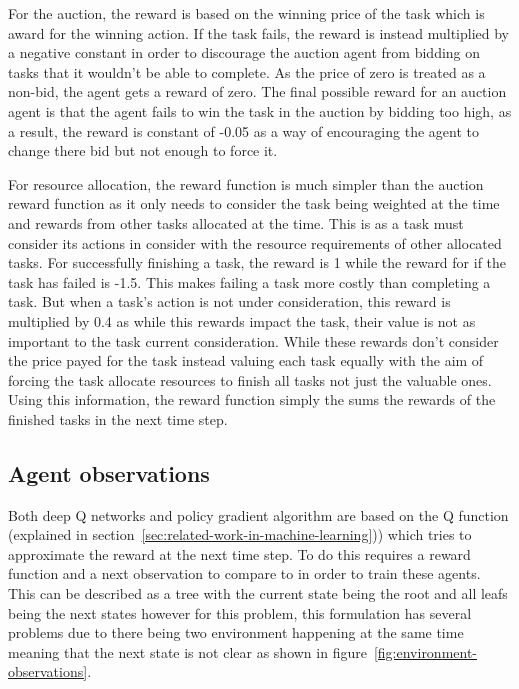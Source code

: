 For the auction, the reward is based on the winning price of the task which is award for the winning action. If the
task fails, the reward is instead multiplied by a negative constant in order to discourage the auction agent from
bidding on tasks that it wouldn't be able to complete.
As the price of zero is treated as a non-bid, the agent gets a reward of zero. The final possible reward for an auction
agent is that the agent fails to win the task in the auction by
bidding too high, as a result, the reward is constant of -0.05 as a way of encouraging the agent to change there bid but
not enough to force it.

For resource allocation, the reward function is much simpler than the auction reward function as it only needs to
consider the task being weighted at the time and rewards from other tasks allocated at the time. This is as
a task must consider its actions in consider with the resource requirements of other allocated tasks. For successfully
finishing a task, the reward is 1 while the reward for if the task has failed is -1.5. This makes failing a task more
costly than completing a task. But when a task's action is not under consideration, this reward is multiplied by
0.4 as while this rewards impact the task, their value is not as important to the task current consideration.
While these rewards don't consider the price payed for the task instead valuing each task equally with the aim of
forcing the task allocate resources to finish all tasks not just the valuable ones. Using this information, the reward
function simply the sums the rewards of the finished tasks in the next time step.

\subsection{Agent observations}\label{subsec:agent-observations}
Both deep Q networks and policy gradient algorithm are based on the Q function (explained in
section~\ref{sec:related-work-in-machine-learning})) which tries to approximate the reward at the next time step. To do
this requires a reward function and a next observation to compare to in order to train these agents. This can be
described as a tree with the current state being the root and all leafs being the next states however for this problem,
this formulation has several problems due to there being two environment happening at the same time meaning that the
next state is not clear as shown in figure~\ref{fig:environment-observations}.


